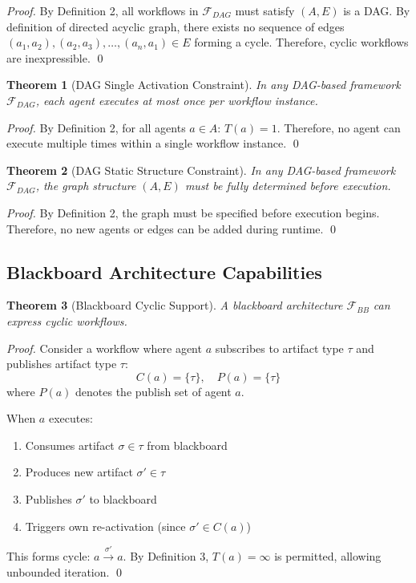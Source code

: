 \documentclass[11pt]{article}
\newtheorem{theorem}{Theorem}
\begin{document}
\begin{proof}
By Definition 2, all workflows in $\mathcal{F}_{DAG}$ must satisfy $(A, E)$ is a DAG. By definition of directed acyclic graph, there exists no sequence of edges $(a_1, a_2), (a_2, a_3), \ldots, (a_n, a_1) \in E$ forming a cycle. Therefore, cyclic workflows are inexpressible. \qed
\end{proof}

\begin{theorem}[DAG Single Activation Constraint]
\label{thm:dag-single}
In any DAG-based framework $\mathcal{F}_{DAG}$, each agent executes at most once per workflow instance.
\end{theorem}

\begin{proof}
By Definition 2, for all agents $a \in A$: $T(a) = 1$. Therefore, no agent can execute multiple times within a single workflow instance. \qed
\end{proof}

\begin{theorem}[DAG Static Structure Constraint]
\label{thm:dag-static}
In any DAG-based framework $\mathcal{F}_{DAG}$, the graph structure $(A, E)$ must be fully determined before execution.
\end{theorem}

\begin{proof}
By Definition 2, the graph must be specified before execution begins. Therefore, no new agents or edges can be added during runtime. \qed
\end{proof}

\subsection{Blackboard Architecture Capabilities}

\begin{theorem}[Blackboard Cyclic Support]
\label{thm:bb-cyclic}
A blackboard architecture $\mathcal{F}_{BB}$ can express cyclic workflows.
\end{theorem}

\begin{proof}
Consider a workflow where agent $a$ subscribes to artifact type $\tau$ and publishes artifact type $\tau$:
\[C(a) = \{\tau\}, \quad P(a) = \{\tau\}\]
where $P(a)$ denotes the publish set of agent $a$.

When $a$ executes:
\begin{enumerate}
    \item Consumes artifact $\sigma \in \tau$ from blackboard
    \item Produces new artifact $\sigma' \in \tau$
    \item Publishes $\sigma'$ to blackboard
    \item Triggers own re-activation (since $\sigma' \in C(a)$)
\end{enumerate}

This forms cycle: $a \xrightarrow{\sigma'} a$. By Definition 3, $T(a) = \infty$ is permitted, allowing unbounded iteration. \qed
\end{proof}
\end{document}
